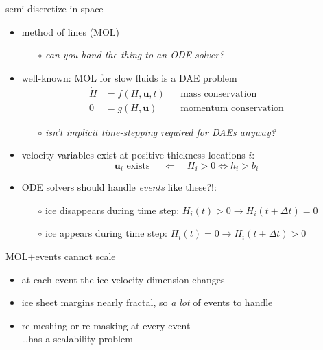 \documentclass[hide notes,intlimits,usenames,dvipsnames]{beamer}
\begin{document}
\begin{frame}{semi-discretize in space}

\begin{itemize}
\item method of lines (MOL)
    \begin{itemize}
    \item[$\circ$] \emph{can you hand the thing to an ODE solver?}
    \end{itemize}
\item well-known: MOL for slow fluids is a DAE problem
\begin{align*}
\dot H &= f(H,\mathbf{u},t) && \text{mass conservation} \\
     0 &= g(H,\mathbf{u})   && \text{momentum conservation}
\end{align*}
\vspace{-5mm}
    \begin{itemize}
    \item[$\circ$] \emph{isn't implicit time-stepping required for DAEs anyway?}
    \end{itemize}
\item velocity variables exist at positive-thickness locations $i$:
    $$\mathbf{u}_i \text{ exists } \quad \Longleftarrow \quad H_i > 0 \iff h_i > b_i$$
\item ODE solvers should handle \emph{events} like these?!:
    \begin{itemize}
    \item[$\circ$] ice disappears during time step:  $H_i(t)>0 \to H_i(t+\Delta t)=0$
    \item[$\circ$] ice appears during time step:  $H_i(t)=0 \to H_i(t+\Delta t)>0$
    \end{itemize}
\end{itemize}
\end{frame}


\begin{frame}{MOL$+$events cannot scale}

\begin{center}

\end{center}

\vspace{-6mm}
\begin{itemize}
\item at each event the ice velocity dimension changes
\item ice sheet margins nearly fractal, so \emph{a lot} of events to handle
\item re-meshing or re-masking at every event \\ \dots has a scalability problem
\end{itemize}
\end{frame}
\end{document}
